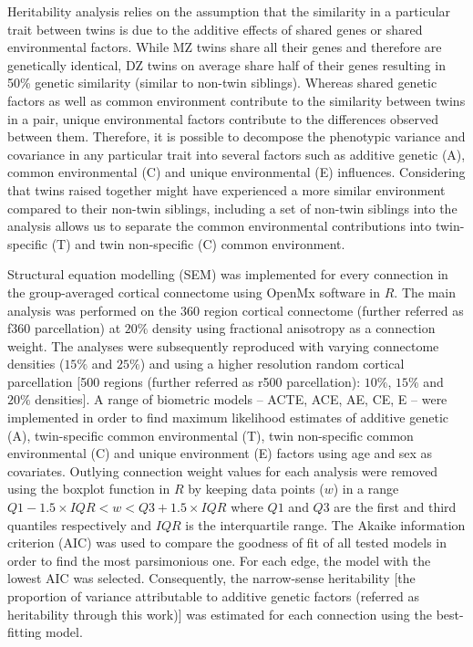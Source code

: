 Heritability analysis relies on the assumption that the similarity in a particular trait between twins is due to the additive effects of shared genes or shared environmental factors. While MZ twins share all their genes and therefore are genetically identical, DZ twins on average share half of their genes resulting in 50\% genetic similarity (similar to non-twin siblings). Whereas shared genetic factors as well as common environment contribute to the similarity between twins in a pair, unique environmental factors contribute to the differences observed between them. Therefore, it is possible to decompose the phenotypic variance and covariance in any particular trait into several factors such as additive genetic (A), common environmental (C) and unique environmental (E) influences. Considering that twins raised together might have experienced a more similar environment compared to their non-twin siblings, including a set of non-twin siblings into the analysis allows us to separate the common environmental contributions into twin-specific (T) and twin non-specific (C) common environment.

Structural equation modelling (SEM) was implemented for every connection in the group-averaged cortical connectome using OpenMx software \citep{Boker2011,Neale2016} in $R$. The main analysis was performed on the 360 region \citep{Glasser2016} cortical connectome (further referred as f360 parcellation) at $20\%$ density using fractional anisotropy as a connection weight. The analyses were subsequently reproduced with varying connectome densities ($15\%$ and $25\%$) and using a higher resolution random cortical parcellation [500 regions (further referred as r500 parcellation): $10\%$, $15\%$ and $20\%$ densities]. A range of biometric models -- ACTE, ACE, AE, CE, E -- were implemented in order to find maximum likelihood estimates of additive genetic (A), twin-specific common environmental (T), twin non-specific common environmental (C) and unique environment (E) factors using age and sex as covariates. Outlying connection weight values for each analysis were removed using the boxplot function in $R$ by keeping data points ($w$) in a range $Q1-1.5 \times IQR< w <Q3+1.5 \times IQR$ where $Q1$ and $Q3$ are the first and third quantiles respectively and $IQR$ is the interquartile range. The Akaike information criterion (AIC) \citep{Akaike1998} was used to compare the goodness of fit of all tested models in order to find the most parsimonious one. For each edge, the model with the lowest AIC was selected. Consequently, the narrow-sense heritability [the proportion of variance attributable to additive genetic factors (referred as heritability through this work)] was estimated for each connection using the best-fitting model.

